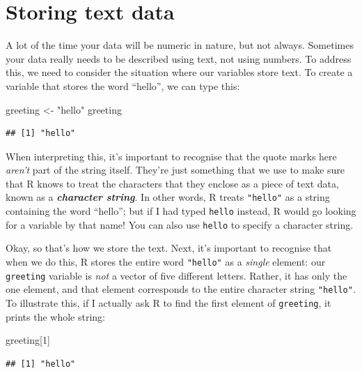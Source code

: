 \documentclass[
]{book}
\newenvironment{Shaded}{\begin{snugshade}}{\end{snugshade}}
\newcommand{\DecValTok}[1]{\textcolor[rgb]{0.00,0.00,0.81}{#1}}
\newcommand{\NormalTok}[1]{#1}
\newcommand{\OtherTok}[1]{\textcolor[rgb]{0.56,0.35,0.01}{#1}}
\newcommand{\StringTok}[1]{\textcolor[rgb]{0.31,0.60,0.02}{#1}}
\begin{document}
\hypertarget{text}{%
\section{Storing text data}\label{text}}

A lot of the time your data will be numeric in nature, but not always. Sometimes your data really needs to be described using text, not using numbers. To address this, we need to consider the situation where our variables store text. To create a variable that stores the word ``hello'', we can type this:

\begin{Shaded}
\begin{Highlighting}[]
\NormalTok{greeting }\OtherTok{\textless{}{-}} \StringTok{"hello"}
\NormalTok{greeting}
\end{Highlighting}
\end{Shaded}

\begin{verbatim}
## [1] "hello"
\end{verbatim}

When interpreting this, it's important to recognise that the quote marks here \emph{aren't} part of the string itself. They're just something that we use to make sure that R knows to treat the characters that they enclose as a piece of text data, known as a \textbf{\emph{character string}}. In other words, R treats \texttt{"hello"} as a string containing the word ``hello''; but if I had typed \texttt{hello} instead, R would go looking for a variable by that name! You can also use \texttt{\textquotesingle{}hello\textquotesingle{}} to specify a character string.

Okay, so that's how we store the text. Next, it's important to recognise that when we do this, R stores the entire word \texttt{"hello"} as a \emph{single} element: our \texttt{greeting} variable is \emph{not} a vector of five different letters. Rather, it has only the one element, and that element corresponds to the entire character string \texttt{"hello"}. To illustrate this, if I actually ask R to find the first element of \texttt{greeting}, it prints the whole string:

\begin{Shaded}
\begin{Highlighting}[]
\NormalTok{greeting[}\DecValTok{1}\NormalTok{]}
\end{Highlighting}
\end{Shaded}

\begin{verbatim}
## [1] "hello"
\end{verbatim}
\end{document}
